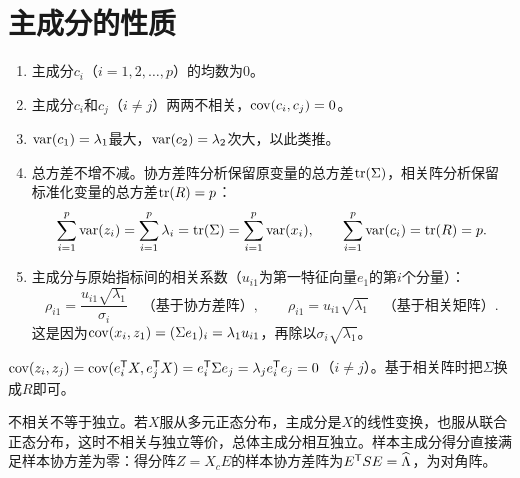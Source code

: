 \section{主成分的性质}\label{sec:pc-prop}
\begin{enumerate}
\item 主成分$c_i$（$i=1,2,\ldots,p$）的均数为0。
\item 主成分$c_i$和$c_j$（$i\ne j$）两两不相关，$\operatorname{cov}(c_i,c_j)=0$。
\item $\operatorname{var}(c_1)=\lambda_1$最大，$\operatorname{var}(c_2)=\lambda_2$次大，以此类推。
\item 总方差不增不减。协方差阵分析保留原变量的总方差$\operatorname{tr}(\Sigma)$，相关阵分析保留标准化变量的总方差$\operatorname{tr}(R)=p$：
\[
\sum_{i=1}^{p}\operatorname{var}(z_i)=\sum_{i=1}^p\lambda_i=\operatorname{tr}(\Sigma)=\sum_{i=1}^{p}\operatorname{var}(x_i),\qquad
\sum_{i=1}^{p}\operatorname{var}(c_i)=\operatorname{tr}(R)=p.
\]
\item 主成分与原始指标间的相关系数（$u_{i1}$为第一特征向量$e_1$的第$i$个分量）：
\[
\rho_{i1}=\frac{u_{i1}\sqrt{\lambda_1}}{\sigma_i}\quad\text{（基于协方差阵）},\qquad
\rho_{i1}=u_{i1}\sqrt{\lambda_1}\quad\text{（基于相关矩阵）}.
\]
这是因为$\operatorname{cov}(x_i,z_1)=(\Sigma e_1)_i=\lambda_1u_{i1}$，再除以$\sigma_i\sqrt{\lambda_1}$。
\end{enumerate}
\begin{zm}[性质2]
$\operatorname{cov}(z_i,z_j)=\operatorname{cov}(e_i^{\mathsf T} X,e_j^{\mathsf T} X)=e_i^{\mathsf T}\Sigma e_j=\lambda_je_i^{\mathsf T} e_j=0$（$i\ne j$）。基于相关阵时把$\Sigma$换成$R$即可。
\end{zm}
不相关不等于独立。若$X$服从多元正态分布，主成分是$X$的线性变换，也服从联合正态分布，这时不相关与独立等价，总体主成分相互独立。样本主成分得分直接满足样本协方差为零：得分阵$Z=X_cE$的样本协方差阵为$E^{\mathsf T} SE=\widehat\Lambda$，为对角阵。


